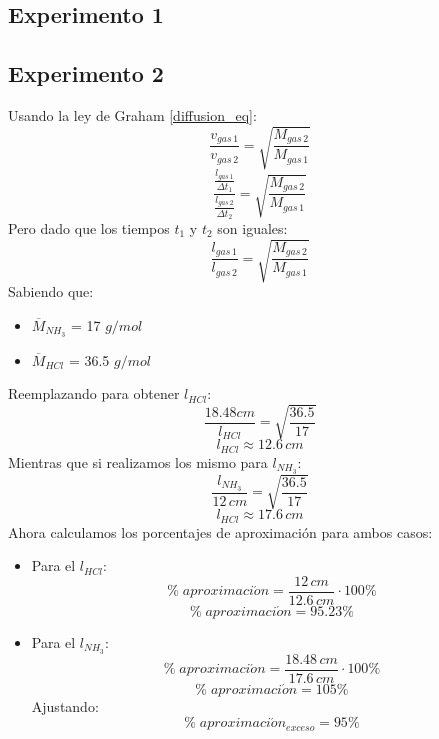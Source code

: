 \documentclass[../main.tex]{subfiles}
\begin{document}
\subsection{Experimento 1}

\subsection{Experimento 2}

Usando la ley de Graham \ref{diffusion_eq}:
\begin{equation}
    \frac{v_{gas\, 1}}{v_{gas\, 2}} =
    \sqrt{\frac{M_{gas\, 2}}{M_{gas\, 1}}} 
\end{equation}
\[
    \frac{\frac{l_{gas\, 1}}{\Delta t_1}}{\frac{l_{gas\, 2}}{\Delta t_2}} =
    \sqrt{\frac{M_{gas\, 2}}{M_{gas\, 1}}} 
\]
Pero dado que los tiempos $t_1$ y $t_2$ son iguales:
\[
    \frac{l_{gas\, 1}}{l_{gas\, 2}} =
    \sqrt{\frac{M_{gas\, 2}}{M_{gas\, 1}}} 
\]
Sabiendo que:
\begin{itemize}
    \item $\overline{M}_{NH_3}$ = 17 $g/mol$
    \item $\overline{M}_{HCl}$  = 36.5 $g/mol$
\end{itemize}
Reemplazando para obtener $l_{HCl}$:
\[
    \frac{18.48 cm}{l_{HCl}} =
    \sqrt{\frac{36.5}{17}} 
\]
\[ l_{HCl} \approx 12.6 \, cm\]
Mientras que si realizamos los mismo para $l_{NH_3}$:
\[
    \frac{l_{NH_3}}{12 \, cm} =
    \sqrt{\frac{36.5}{17}} 
\]
\[ l_{HCl} \approx 17.6 \, cm\]
Ahora calculamos los porcentajes de aproximación
para ambos casos:
\begin{itemize}
    \item Para el $l_{HCl}$:
    \[ \% \; aproximaci\acute{o}n = \frac{12 \, cm}{12.6 \, cm} \cdot 100\%\]
    \[ \% \; aproximaci\acute{o}n = 95.23\%\]
    \item Para el $l_{NH_3}$:
    \[ \% \; aproximaci\acute{o}n = \frac{18.48 \, cm}{17.6 \, cm} \cdot 100\%\]
    \[ \% \; aproximaci\acute{o}n = 105\%\]
    Ajustando:
    \[ \% \; aproximaci\acute{o}n_{exceso} = 95\%\]
\end{itemize}
\end{document}
